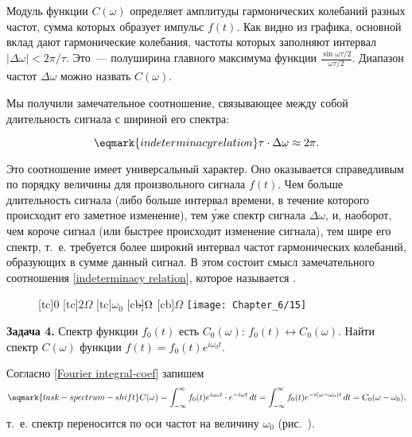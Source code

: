 Модуль функции $C(\omega)$ определяет амплитуды гармонических колебаний разных
частот, сумма которых образует импульс
$f(t)$. Как видно из графика, основной вклад дают гармонические колебания,
частоты которых заполняют интервал
$|\Delta\omega|<2\pi/\tau$. Это~--- полуширина главного максимума функции
$\frac{\sin\omega\tau/2}{\omega\tau/2}$. Диапазон частот $\Delta\omega$ можно
назвать  $C(\omega)$.

Мы получили замечательное соотношение, связывающее между собой длительность
сигнала с шириной его спектра:

\begin{equation}
    \eqmark{indeterminacy relation}
    \tau \cdot \Delta\omega \approx 2\pi.
\end{equation}

Это соотношение имеет универсальный характер. Оно оказывается справедливым по
порядку величины для произвольного сигнала
$f(t)$. Чем больше длительность сигнала (либо больше интервал времени, в течение
которого происходит его заметное
изменение), тем \'уже спектр сигнала $\Delta\omega$, и, наоборот, чем короче
сигнал (или быстрее происходит изменение
сигнала), тем шире его спектр, т.~е. требуется более широкий интервал частот
гармонических колебаний, образующих в сумме
данный сигнал. В этом состоит смысл замечательного соотношения
\eqref{indeterminacy relation}, которое называется .
\begin{figure}[h!]
    [tc]{0}
    [tc]{$2\Omega$}
    [tc]{$\omega_0$}
    [cb]{$\llap{$-$}\Omega$}
    [cb]{$\Omega$}
    \texttt{[image: Chapter\_6/15]}
    \caption{}
\end{figure}

\textbf{Задача 4.} Спектр функции $f_0(t)$ есть $C_0(\omega)$:
$f_0(t)\leftrightarrow C_0(\omega)$. Найти спектр $C(\omega)$ функции
$f(t)=f_0(t)e^{i\omega_0t}$.

Согласно \eqref{Fourier integral-coef} запишем
\begin{equation}
    \eqmark{task-spectrum-shift}
    C(\omega)=\int_{-\infty}^\infty f_0(t)e^{i\omega_0 t}\cdot e^{-i\omega
t}\,dt=\int_{-\infty}^\infty
f_0(t)e^{-i(\omega-\omega_0)t}\,dt=C_0(\omega-\omega_0),
\end{equation}
т.~е. спектр переносится по оси частот на величину $\omega_0$
(рис.~).

